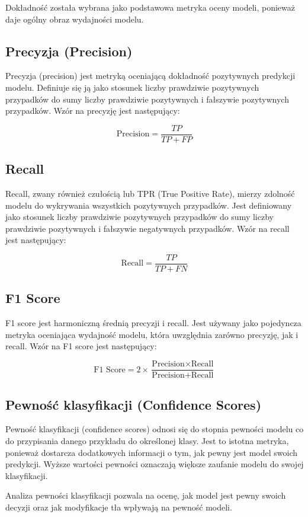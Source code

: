 Dokładność została wybrana jako podstawowa metryka oceny modeli, ponieważ daje ogólny obraz wydajności modelu.

\subsection*{Precyzja (Precision)}
Precyzja (precision) jest metryką oceniającą dokładność pozytywnych predykcji modelu. Definiuje się ją jako stosunek liczby prawdziwie pozytywnych przypadków do sumy liczby prawdziwie pozytywnych i fałszywie pozytywnych przypadków. 
Wzór na precyzję jest następujący:

\[
\text{Precision} = \frac{TP}{TP + FP}
\]


\subsection*{Recall}
Recall, zwany również czułością lub TPR (True Positive Rate), mierzy zdolność modelu do wykrywania wszystkich pozytywnych przypadków. Jest definiowany jako stosunek liczby prawdziwie pozytywnych przypadków do sumy liczby prawdziwie 
pozytywnych i fałszywie negatywnych przypadków. Wzór na recall 
jest następujący:

\[
\text{Recall} = \frac{TP}{TP + FN}
\]

\subsection*{F1 Score}
F1 score jest harmoniczną średnią precyzji i recall. Jest używany jako pojedyncza metryka oceniająca wydajność modelu, która uwzględnia zarówno precyzję, jak i recall. Wzór na F1 score jest następujący:

\[
\text{F1 Score} = 2 \times \frac{\text{Precision} \times \text{Recall}}{\text{Precision} + \text{Recall}}
\]


\subsection*{Pewność klasyfikacji (Confidence Scores)}

Pewność klasyfikacji (confidence scores) odnosi się do stopnia pewności modelu co do przypisania danego przykładu do określonej klasy. Jest to istotna metryka, ponieważ dostarcza dodatkowych informacji o tym, jak pewny jest model swoich 
predykcji. Wyższe wartości pewności oznaczają większe zaufanie modelu do swojej klasyfikacji.

Analiza pewności klasyfikacji pozwala na ocenę, jak model jest pewny swoich decyzji oraz jak modyfikacje tła wpływają na pewność modeli.

